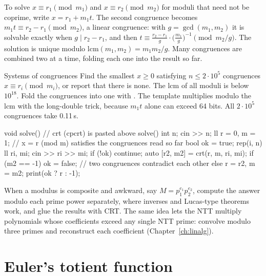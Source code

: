 To solve $x \equiv r_1 \pmod{m_1}$ and $x \equiv r_2 \pmod{m_2}$ for moduli that need not be coprime, write $x = r_1 + m_1 t$. The
second congruence becomes $m_1 t \equiv r_2 - r_1 \pmod{m_2}$, a linear congruence: with $g = \gcd(m_1, m_2)$ it is solvable exactly
when $g \mid r_2 - r_1$, and then $t \equiv \frac{r_2 - r_1}{g} \cdot \bigl(\frac{m_1}{g}\bigr)^{-1} \pmod{m_2/g}$. The solution is
unique modulo $\mathrm{lcm}(m_1, m_2) = m_1 m_2 / g$. Many congruences are combined two at a time, folding each one into the result
so far.


\begin{problem}{Systems of congruences}
Find the smallest $x \ge 0$ satisfying $n \le 2 \cdot 10^5$ congruences $x \equiv r_i \pmod{m_i}$, or report that there is none. The lcm
of all moduli is below $10^{18}$.
\solution Fold the congruences into one with . The template multiplies modulo the lcm with the long-double trick, because
$m_1 t$ alone can exceed 64 bits. All $2 \cdot 10^5$ congruences take 0.11\,s.
\end{problem}

\begin{code}
void solve() {  // crt (cpcrt) is pasted above solve()
    int n;
    cin >> n;
    ll r = 0, m = 1;  // x = r (mod m) satisfies the congruences read so far
    bool ok = true;
    rep(i, n) {
        ll ri, mi;
        cin >> ri >> mi;
        if (!ok) continue;
        auto [r2, m2] = crt(r, m, ri, mi);
        if (m2 == -1) ok = false;  // two congruences contradict each other
        else r = r2, m = m2;
    }
    print(ok ? r : -1);
}
\end{code}

\begin{trick}
When a modulus is composite and awkward, say $M = p_1^{e_1} p_2^{e_2}$, compute the answer modulo each prime power separately, where
inverses and Lucas-type theorems work, and glue the results with CRT. The same idea lets the NTT multiply polynomials whose coefficients
exceed any single NTT prime: convolve modulo three primes and reconstruct each coefficient (Chapter~\ref{ch:linalg}).
\end{trick}

\section[Euler's totient function]{Euler's totient function \hfill \plat}\label{sec:totient}

